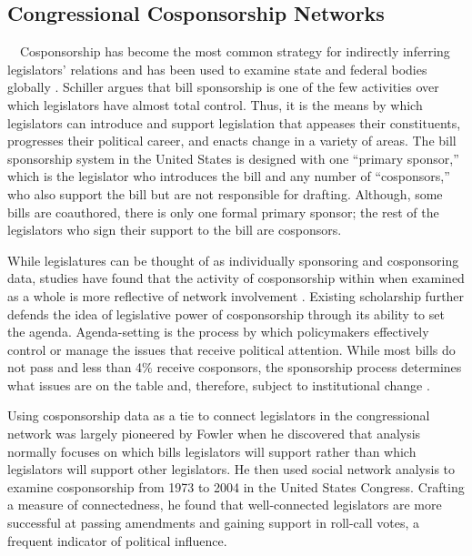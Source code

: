 \documentclass[Royal,times,sageh]{sagej}
\begin{document}
\hypertarget{congressional-cosponsorship-networks}{%
\subsection{Congressional Cosponsorship
Networks}\label{congressional-cosponsorship-networks}}

~~Cosponsorship has become the most common strategy for indirectly
inferring legislators' relations and has been used to examine state and
federal bodies globally \citep{neal2020}. Schiller
\citeyearpar{schiller1995} argues that bill sponsorship is one of the
few activities over which legislators have almost total control. Thus,
it is the means by which legislators can introduce and support
legislation that appeases their constituents, progresses their political
career, and enacts change in a variety of areas. The bill sponsorship
system in the United States is designed with one ``primary sponsor,''
which is the legislator who introduces the bill and any number of
``cosponsors,'' who also support the bill but are not responsible for
drafting. Although, some bills are coauthored, there is only one formal
primary sponsor; the rest of the legislators who sign their support to
the bill are cosponsors.

While legislatures can be thought of as individually sponsoring and
cosponsoring data, studies have found that the activity of cosponsorship
within when examined as a whole is more reflective of network
involvement \citep{fowler2006}. Existing scholarship further defends the
idea of legislative power of cosponsorship through its ability to set
the agenda. Agenda-setting is the process by which policymakers
effectively control or manage the issues that receive political
attention. While most bills do not pass and less than 4\% receive
cosponsors, the sponsorship process determines what issues are on the
table and, therefore, subject to institutional change
\citep{bratton2011}.

Using cosponsorship data as a tie to connect legislators in the
congressional network was largely pioneered by Fowler
\citeyearpar{fowler2006} when he discovered that analysis normally
focuses on which bills legislators will support rather than which
legislators will support other legislators. He then used social network
analysis to examine cosponsorship from 1973 to 2004 in the United States
Congress. Crafting a measure of connectedness, he found that
well-connected legislators are more successful at passing amendments and
gaining support in roll-call votes, a frequent indicator of political
influence.
\end{document}
